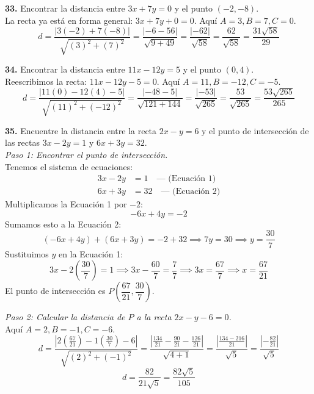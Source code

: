 \documentclass{article}
\begin{document}
\vspace{0.5cm}
\textbf{33.} Encontrar la distancia entre $3x + 7y = 0$ y el punto $(-2, -8)$.\\
La recta ya está en forma general: $3x + 7y + 0 = 0$. Aquí $A=3, B=7, C=0$.
\[
d = \frac{|3(-2) + 7(-8)|}{\sqrt{(3)^2 + (7)^2}} = \frac{|-6 - 56|}{\sqrt{9 + 49}} = \frac{|-62|}{\sqrt{58}} = \frac{62}{\sqrt{58}} = \frac{31\sqrt{58}}{29}
\]

\vspace{0.5cm}
\textbf{34.} Encontrar la distancia entre $11x - 12y = 5$ y el punto $(0, 4)$.\\
Reescribimos la recta: $11x - 12y - 5 = 0$. Aquí $A=11, B=-12, C=-5$.
\[
d = \frac{|11(0) - 12(4) - 5|}{\sqrt{(11)^2 + (-12)^2}} = \frac{|-48 - 5|}{\sqrt{121 + 144}} = \frac{|-53|}{\sqrt{265}} = \frac{53}{\sqrt{265}} = \frac{53\sqrt{265}}{265}
\]

\vspace{0.5cm}
\textbf{35.} Encuentre la distancia entre la recta $2x - y = 6$ y el punto de intersección de las rectas $3x - 2y = 1$ y $6x + 3y = 32$.\\
\textit{Paso 1: Encontrar el punto de intersección.}\\
Tenemos el sistema de ecuaciones:
\begin{align*}
    3x - 2y &= 1 \quad \text{--- (Ecuación 1)} \\
    6x + 3y &= 32 \quad \text{--- (Ecuación 2)}
\end{align*}
Multiplicamos la Ecuación 1 por $-2$:
\[
-6x + 4y = -2
\]
Sumamos esto a la Ecuación 2:
\[
(-6x + 4y) + (6x + 3y) = -2 + 32 \implies 7y = 30 \implies y = \frac{30}{7}
\]
Sustituimos $y$ en la Ecuación 1:
\[
3x - 2\left(\frac{30}{7}\right) = 1 \implies 3x - \frac{60}{7} = \frac{7}{7} \implies 3x = \frac{67}{7} \implies x = \frac{67}{21}
\]
El punto de intersección es $P\left(\dfrac{67}{21}, \dfrac{30}{7}\right)$.

\vspace{0.25cm}
\textit{Paso 2: Calcular la distancia de $P$ a la recta $2x - y - 6 = 0$.}\\
Aquí $A=2, B=-1, C=-6$.
\[
d = \frac{\left|2\left(\frac{67}{21}\right) - 1\left(\frac{30}{7}\right) - 6\right|}{\sqrt{(2)^2 + (-1)^2}} = \frac{\left|\frac{134}{21} - \frac{90}{21} - \frac{126}{21}\right|}{\sqrt{4 + 1}} = \frac{\left|\frac{134 - 216}{21}\right|}{\sqrt{5}} = \frac{\left|-\frac{82}{21}\right|}{\sqrt{5}}
\]
\[
d = \frac{82}{21\sqrt{5}} = \frac{82\sqrt{5}}{105}
\]
\end{document}
